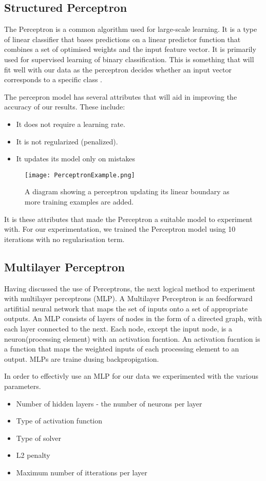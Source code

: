 \documentclass[bsc,frontabs,twoside,singlespacing,parskip,deptreport]{infthesis}     %
\begin{document}
\subsection{Structured Perceptron}
The Perceptron is a common algorithm used for large-scale learning.
It is a type of linear classifier that bases predictions on a linear predictor function that combines a set of optimised weights
and the input feature vector.
It is primarily used for supervised learning of binary classification.
This is something that will fit well with our data as the perceptron decides whether an input vector
corresponds to a specific class \cite{freund1999large}.

The percepron model has several attributes that will aid in improving the accuracy of our results.
These include:
\begin{itemize}
\item It does not require a learning rate.
\item It is not regularized (penalized).
\item It updates its model only on mistakes
\end{itemize}

\begin{figure}[h]
  \centering
  \texttt{[image: PerceptronExample.png]}
  \caption{A diagram showing a perceptron updating its linear boundary as more training examples are added. }
\end{figure}


It is these attributes that made the Perceptron a suitable model to experiment with.
For our experimentation, we trained the Perceptron model using  10 iterations with no regularisation term.
\subsection{Multilayer Perceptron}
Having discussed the use of Perceptrons, the next logical method to experiment with multilayer perceptrons (MLP).
A Multilayer Perceptron is an feedforward artifitial neural network that maps the set of inputs
onto a set of appropriate outputs.
An MLP consists of layers of  nodes in the form of a directed graph, with each layer connected to the next.
Each node, except the input node, is a neuron(processing element) with an activation fucntion.
An activation fucntion is a function that maps the weighted inputs of each processing element to an output.
MLPs are traine dusing backpropigation.

In order to effectivly use an MLP for our data we experimented with the various parameters.
\begin{itemize}
  \item Number of hidden layers - the number of neurons per layer
  \item Type of activation function
  \item Type of solver
  \item L2 penalty
  \item Maximum number of itterations per layer
\end{itemize}
\end{document}

